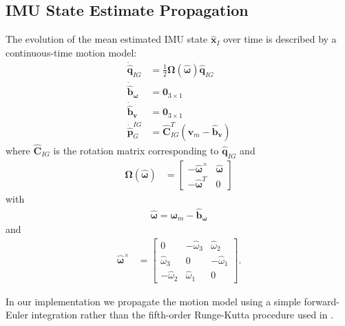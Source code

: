 \documentclass[letterpaper, 10 pt, conference]{ieeeconf}  %
\def\Vec#1{\mathbf{#1}}
\newcommand{\bbm}{\begin{bmatrix}}
\newcommand{\ebm}{\end{bmatrix}}
\begin{document}
\subsection{IMU State Estimate Propagation}
The evolution of the mean estimated IMU state $\hat{\Vec{x}}_I$ over time is described by a continuous-time motion model:
\begin{align}
    \dot{\hat{\Vec{q}}}_{IG} &= \frac{1}{2}\boldsymbol{\Omega}\left(\hat{\boldsymbol{\omega}}\right)\hat{\Vec{q}}_{IG} \\
    \dot{\hat{\Vec{b}}}_{\boldsymbol{\omega}}  &= \Vec{0}_{3\times1} \\
    \dot{\hat{\Vec{b}}}_{\Vec{v}} &= \Vec{0}_{3\times1} \\
    \dot{\hat{\Vec{p}}}^{IG}_G &= \hat{\Vec{C}}_{I G}^T\left(\Vec{v}_m - \hat{\Vec{b}}_{\Vec{v}} \right)
\end{align}
where $\hat{\Vec{C}}_{I G}$ is the rotation matrix corresponding to $\hat{\Vec{q}}_{IG}$ and
\begin{align*}
    \boldsymbol{\Omega}\left(\hat{\boldsymbol{\omega}}\right) &= \bbm -\hat{\boldsymbol{\omega}}^\times & \hat{\boldsymbol{\omega}} \\
                                                                -\hat{\boldsymbol{\omega}}^T & 0
                                                            \ebm 
\end{align*}
with
\begin{align*}
    \hat{\boldsymbol{\omega}} = \boldsymbol{\omega}_m - \hat{\Vec{b}}_{\boldsymbol{\omega}}
\end{align*}
and
\begin{align*}
    \hat{\boldsymbol{\omega}}^\times &=   \bbm    0 & -\hat{\omega}_3 & \hat{\omega}_2 \\
                                                \hat{\omega}_3 & 0 & -\hat{\omega}_1 \\
                                                -\hat{\omega}_2 & \hat{\omega}_1 & 0
                                            \ebm .
\end{align*}

In our implementation we propagate the motion model using a simple forward-Euler integration rather than the fifth-order Runge-Kutta procedure used in \cite{Mourikis:2007:ICRA}.
\end{document}
